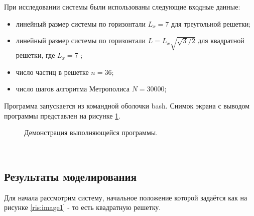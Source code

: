 \documentclass[14pt,a4paper,report]{ncc}
\begin{document}
{При исследовании системы были использованы следующие входные данные:
\begin{itemize}
\begin{itemize}
\item максимальное смещение координаты $\delta=0.005$;
\item $\sigma^{L_{x}=7}_{n=36}=0.985$ для квадратной решетки;
\item $\sigma^{L_{x}=7}_{n=36}=1.047$ для треугольной решетки;
\item температурный множитель $kT=0.0000001$, $kT=0.01$
\end{itemize}
\item линейный размер системы по горизонтали ${L_x=7}$ для треугольной решетки;
\item линейный размер системы по горизонтали ${L=L_x\sqrt{\sqrt{3}/2}}$ для квадратной решетки, где  ${L_x=7}$ ;
\item число частиц в решетке ${n=36}$;
\item число шагов алгоритма Метрополиса ${N=30000}$;
\end{itemize}

Программа запускается из командной оболочки bash. Снимок экрана с выводом программы представлен на рисунке \ref{ris:image3}.
\

\begin{figure}[h]
\caption{Демонстрация выполняющейся программы.}
\label{ris:image3}
\end{figure}
\


 \subsection{Результаты моделирования}
Для начала рассмотрим систему, начальное положение которой задаётся как на рисунке \ref{ris:image1} - то есть квадратную решетку.
\

}
\end{document}

